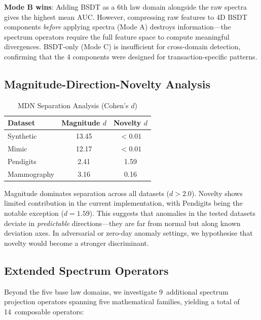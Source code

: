\documentclass[journal]{IEEEtran}
\begin{document}
\textbf{Mode B wins}: Adding BSDT as a 6th law domain alongside the raw spectra gives the highest mean AUC. However, compressing raw features to 4D BSDT components \textit{before} applying spectra (Mode A) destroys information---the spectrum operators require the full feature space to compute meaningful divergences. BSDT-only (Mode C) is insufficient for cross-domain detection, confirming that the 4 components were designed for transaction-specific patterns.

\subsection{Magnitude-Direction-Novelty Analysis}
\label{ssec:mdn_analysis}

\begin{table}[h]
\centering
\caption{MDN Separation Analysis (Cohen's $d$)}
\label{tab:mdn}
\begin{tabular}{@{}lcc@{}}
\toprule
\textbf{Dataset} & \textbf{Magnitude $d$} & \textbf{Novelty $d$} \\
\midrule
Synthetic & 13.45 & $<0.01$ \\
Mimic & 12.17 & $<0.01$ \\
Pendigits & 2.41 & 1.59 \\
Mammography & 3.16 & 0.16 \\
\bottomrule
\end{tabular}
\end{table}

Magnitude dominates separation across all datasets ($d > 2.0$). Novelty shows limited contribution in the current implementation, with Pendigits being the notable exception ($d = 1.59$). This suggests that anomalies in the tested datasets deviate in \textit{predictable} directions---they are far from normal but along known deviation axes. In adversarial or zero-day anomaly settings, we hypothesise that novelty would become a stronger discriminant.

\subsection{Extended Spectrum Operators}
\label{ssec:extended}

Beyond the five base law domains, we investigate 9~additional spectrum projection operators spanning five mathematical families, yielding a total of 14~composable operators:
\end{document}
